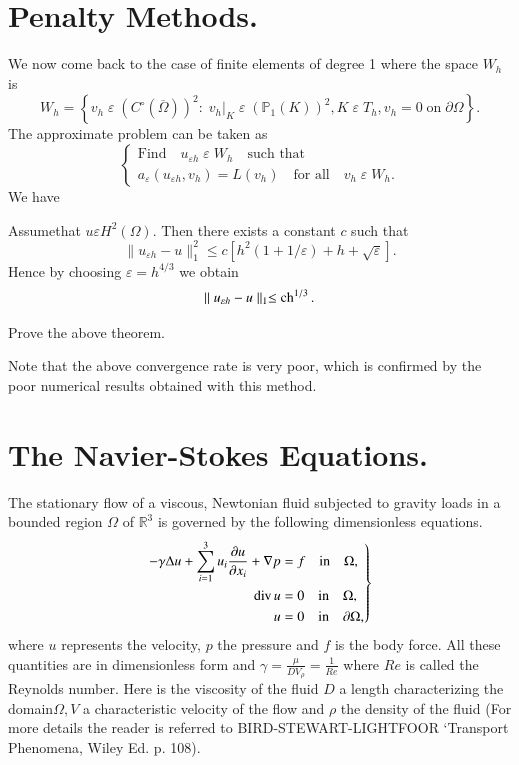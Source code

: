 \section{Penalty Methods.} \label{chap6:ssec6.5} We now come
back to the case of finite elements of degree 1 where the space $W_h$
is 
$$
W_h=\left\{v_h\;\varepsilon \;(C^\circ(\overline{\Omega}))^2:\;v_h|_K\;
\varepsilon \;(\mathbb{P}_1(K))^2, K\;\varepsilon \;T_h, v_h=0
\;\text{on}\; \partial \Omega\right\}.
$$
The approximate problem can be taken as 
\begin{equation*}
\begin{cases}
\text{Find}\quad u_{\varepsilon h}\;\varepsilon \;W_h\quad \text{such
that}\\
a_{\varepsilon}(u_{\varepsilon h}, v_h)=L(v_h)\quad\text{for all}\quad
v_h\;\varepsilon \;W_h.
\end{cases}
\end{equation*}
We have 

\begin{THM}\label{chap6:THM4}
Assume\pageoriginale that $u\varepsilon H^2(\Omega)$. Then there
exists a constant $c$ such that 
$$
\parallel u_{\varepsilon h}-u\parallel_1^2\leq c[h^2(1+1/\varepsilon)
+ h +\sqrt{\varepsilon}].
$$
Hence by choosing $\varepsilon =h^{4/3}$ we obtain
$$
\parallel u_{\varepsilon h}-u\parallel_1\leq\operatorname{ch}^{1/3}.
$$
\end{THM}

\begin{exercise}\label{chap6:exr2}
Prove the above theorem. 

Note that the above convergence rate is very poor, which is confirmed
by the poor numerical results obtained with this method.
\end{exercise}

\section{The Navier-Stokes Equations.} \label{chap6:ssec6.6}
The stationary flow of a viscous, Newtonian fluid subjected to gravity
loads in a bounded region $\Omega$ of $\mathbb{R}^3$ is governed by
the following dimensionless equations.
\begin{equation}\label{chap6:eq6.1}
\left.
\begin{aligned}
-\gamma\Delta u+\sum\limits_{i=1}^3u_i\frac{\partial u} {\partial x_i}
+\nabla p &= f\quad\text{in}\quad\Omega,\\
\operatorname{div} u &= 0\quad\text{in}\quad\Omega,\\
u &= 0\quad\text{in}\quad\partial\Omega,
\end{aligned}
\right\}
\end{equation}
where $u$ represents the velocity, $p$ the pressure and $f$ is the
body force. All these quantities are in dimensionless form and $\gamma
=\frac{\mu}{DV_\rho}=\frac{1}{Re}$ where $Re$ is called the Reynolds
number. Here is the viscosity of the fluid $D$ a length characterizing
the domain\pageoriginale $\Omega,V$ a characteristic velocity of the
flow and $\rho$ the density of the fluid (For more details the reader
is referred to BIRD-STEWART-LIGHTFOOR `Transport Phenomena, Wiley
Ed. p. 108).

